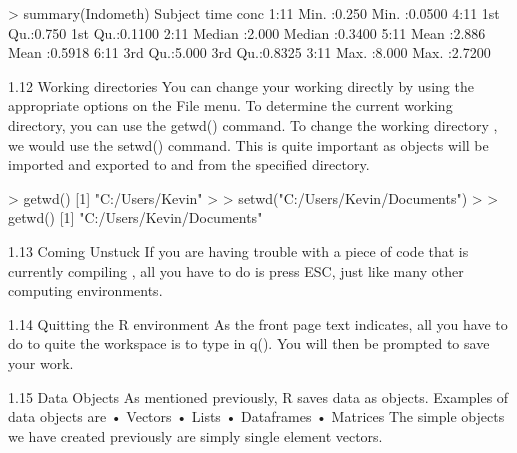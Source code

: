 \documentclass{beamer}
\begin{document}
	\begin{frame}[fragile]
		> summary(Indometh)
		Subject time conc
		1:11 Min. :0.250 Min. :0.0500
		4:11 1st Qu.:0.750 1st Qu.:0.1100
		2:11 Median :2.000 Median :0.3400
		5:11 Mean :2.886 Mean :0.5918
		6:11 3rd Qu.:5.000 3rd Qu.:0.8325
		3:11 Max. :8.000 Max. :2.7200
	\end{frame}
	\begin{frame}[fragile]
		1.12 Working directories
		You can change your working directly by using the appropriate options on the File menu. To
		determine the current working directory, you can use the getwd() command. To change the
		working directory , we would use the setwd() command. This is quite important as objects
		will be imported and exported to and from the specified directory.
	\end{frame}
	\begin{frame}[fragile]
		> getwd()
		[1] "C:/Users/Kevin"
		>
		> setwd("C:/Users/Kevin/Documents")
		>
		> getwd()
		[1] "C:/Users/Kevin/Documents"
	\end{frame}
	\begin{frame}[fragile]
		1.13 Coming Unstuck
		If you are having trouble with a piece of code that is currently compiling , all you have to do
		is press ESC, just like many other computing environments.
	\end{frame}
	\begin{frame}[fragile]
		1.14 Quitting the R environment
		As the front page text indicates, all you have to do to quite the workspace is to type in q().
		You will then be prompted to save your work.
	\end{frame}
	\begin{frame}
		
		1.15 Data Objects
		As mentioned previously, R saves data as objects. Examples of data objects are
		• Vectors
		• Lists
		• Dataframes
		• Matrices
		The simple objects we have created previously are simply single element vectors.
	\end{frame}
\end{document}
